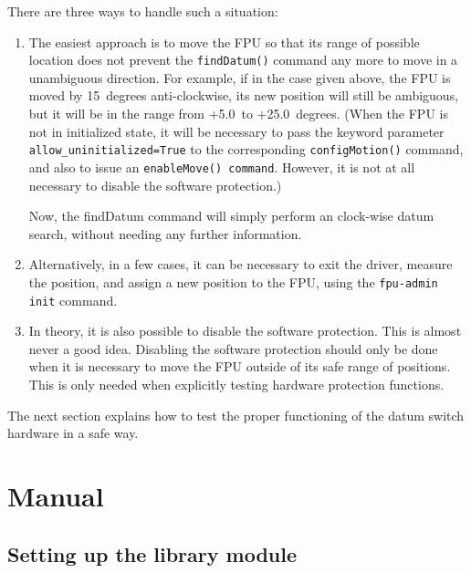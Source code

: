 \documentclass[fontsize=12,a4paper]{scrreprt}
\begin{document}
There are three ways to handle such a situation:

\begin{enumerate}
\item The easiest approach is to move the FPU so that its range of
  possible location does not prevent the \texttt{findDatum()} command
  any more to move in a unambiguous direction. For example, if in the
  case given above, the FPU is moved by 15\degree\ degrees
  anti-clockwise, its new position will still be ambiguous, but it
  will be in the range from +5.0\degree\ to
  +25.0\degree\ degrees. (When the FPU is not in initialized state, it
  will be necessary to pass the keyword parameter
  \texttt{allow\_uninitialized=True} to the corresponding
  \texttt{configMotion()} command, and also to issue an
  \texttt{enableMove() command}. However, it is not at all necessary
  to disable the software protection.)

  Now, the findDatum command will simply perform an clock-wise datum
  search, without needing any further information.

\item Alternatively, in a few cases, it can be necessary to exit the
  driver, measure the position, and assign a new position to the FPU,
  using the \texttt{fpu-admin init} command.

\item In theory, it is also possible to disable the software
  protection.  This is almost never a good idea. Disabling the
  software protection should only be done when it is necessary to move
  the FPU outside of its safe range of positions. This is only needed
  when explicitly testing hardware protection functions.
\end{enumerate}

The next section explains how to test the proper functioning of the
datum switch hardware in a safe way.


\part{Manual}

\chapter{Setting up the library module}
\label{sec:settingup}
\end{document}
